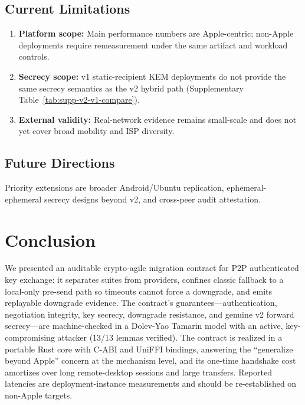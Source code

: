 \documentclass[10pt,journal,compsoc]{IEEEtran}
\begin{document}
\subsection{Current Limitations}
\begin{enumerate}
\item \textbf{Platform scope:} Main performance numbers are Apple-centric;
non-Apple deployments require remeasurement under the same artifact and
workload controls.
\item \textbf{Secrecy scope:} v1 static-recipient KEM deployments do not
provide the same secrecy semantics as the v2 hybrid path
(Supplementary Table~\ref{tab:supp-v2-v1-compare}).
\item \textbf{External validity:} Real-network evidence remains small-scale
and does not yet cover broad mobility and ISP diversity.
\end{enumerate}

\subsection{Future Directions}
Priority extensions are broader Android/Ubuntu replication,
ephemeral-ephemeral secrecy designs beyond v2, and cross-peer audit
attestation.



\section{Conclusion}\label{sec:conclusion}
We presented an auditable crypto-agile migration contract for P2P
authenticated key exchange: it separates suites from providers, confines
classic fallback to a local-only pre-send path so timeouts cannot force a
downgrade, and emits replayable downgrade evidence. The contract's
guarantees---authentication, negotiation integrity, key secrecy,
downgrade resistance, and genuine v2 forward secrecy---are
machine-checked in a Dolev-Yao Tamarin model with an active,
key-compromising attacker (13/13 lemmas verified). The contract is
realized in a portable Rust core with C-ABI and UniFFI bindings,
answering the ``generalize beyond Apple'' concern at the mechanism level,
and its one-time handshake cost amortizes over long remote-desktop
sessions and large transfers. Reported latencies are
deployment-instance measurements and should be re-established on non-Apple
targets.
\end{document}
